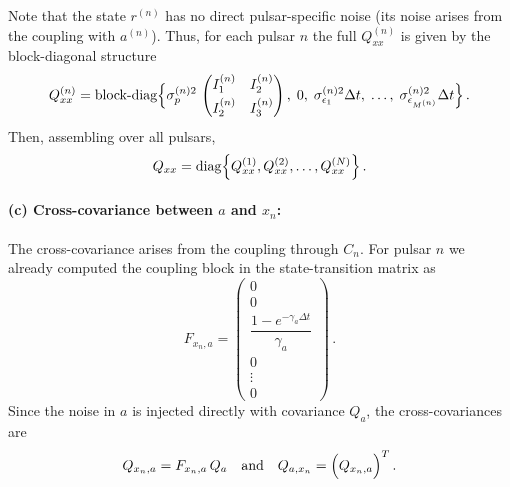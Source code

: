 \documentclass[]{scrartcl}
\begin{document}
	Note that the state \(r^{(n)}\) has no direct pulsar-specific noise (its noise arises from the coupling with \(a^{(n)}\)). Thus, for each pulsar \(n\) the full \(Q_{xx}^{(n)}\) is given by the block-diagonal structure
	\begin{equation}
	Q_{xx}^{(n)} = \text{block-diag} \Bigl\{
	\sigma_{p}^{(n)2}\,
	\begin{pmatrix}
	I_1^{(n)} & I_2^{(n)} \\[1mm]
	I_2^{(n)} & I_3^{(n)}
	\end{pmatrix},\; 0,\; \sigma_{\epsilon_1}^{(n)2}\Delta t,\; \dots,\; \sigma_{\epsilon_{M^{(n)}}}^{(n)2}\Delta t
	\Bigr\}\,.
	\end{equation}
	Then, assembling over all pulsars,
	\begin{equation}
	Q_{xx} = \mathrm{diag}\Bigl\{ Q_{xx}^{(1)}, Q_{xx}^{(2)}, \dots, Q_{xx}^{(N)} \Bigr\}\,.
	\end{equation}
	
	\paragraph{(c) Cross-covariance between \(a\) and \(x_n\):}  
	The cross-covariance arises from the coupling through \(C_n\). For pulsar \(n\) we already computed the coupling block in the state-transition matrix as
	\begin{equation}
	F_{x_n,a} = \begin{pmatrix}
	0 \\[1mm]
	0 \\[1mm]
	\dfrac{1 - e^{-\gamma_a \Delta t}}{\gamma_a} \\[1mm]
	0 \\[1mm]
	\vdots \\[1mm]
	0
	\end{pmatrix}\,.
	\end{equation}
	Since the noise in \(a\) is injected directly with covariance \(Q_a\), the cross-covariances are
	\begin{equation}
	Q_{x_n,a} = F_{x_n,a}\, Q_a \quad \text{and} \quad Q_{a,x_n} = \Bigl(Q_{x_n,a}\Bigr)^T\,.
	\end{equation}
	
\end{document}
